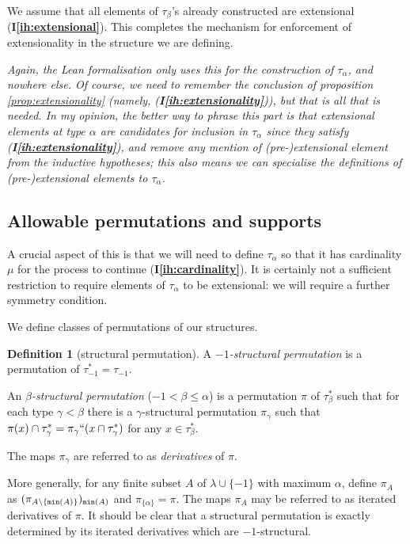 \documentclass[112pt]{article}
\theoremstyle{definition}
\newtheorem{definition}[theorem]{Definition}
\theoremstyle{remark}
\newcommand{\ihref}[1]{(\textbf{I\ref{#1}})}
\newcommand{\rk}[1]{{\color{blue}\sl #1}}
\newenvironment{annot}{\begin{center}\color{blue}\sl}{\end{center}}
\begin{document}
We assume that all elements of $\tau_\beta$'s already constructed are extensional \ihref{ih:extensional}.  This completes the mechanism for enforcement of extensionality in the structure we are defining.

\begin{annot}
  Again, the Lean formalisation only uses this for the construction of $\tau_\alpha$, and nowhere else.
  Of course, we need to remember the conclusion of proposition \ref{prop:extensionality} (namely, \ihref{ih:extensionality}), but that is all that is needed.
  In my opinion, the better way to phrase this part is that extensional elements at type $\alpha$ are candidates for inclusion in $\tau_\alpha$ since they satisfy \ihref{ih:extensionality}, and remove any mention of (pre-)extensional element from the inductive hypotheses; this also means we can specialise the definitions of (pre-)extensional elements to $\tau_\alpha$.
\end{annot}

\subsection{Allowable permutations and supports}

A crucial aspect of this is that we will need to define $\tau_\alpha$ so that it has cardinality $\mu$ for the process to continue {\ihref{ih:cardinality}}.  It is certainly not a sufficient restriction to require elements of $\tau_\alpha$ to be extensional:  we will require a further symmetry condition.

We define classes of permutations of our structures.
\begin{definition}[structural permutation]\label{def:structural_permutation}
A {\em $-1$-structural permutation\/} is a permutation of $\tau_{-1}^* = \tau_{-1}$.

An {\em $\beta$-structural permutation\/} ($-1 < \beta \leq \alpha$) is a permutation $\pi$ of $\tau_\beta^*$ such that for each type $\gamma<\beta$ there is a $\gamma$-structural permutation
$\pi_\gamma$ such that $\pi(x) \cap \tau^*_\gamma = \pi_\gamma``(x \cap \tau^*_\gamma)$ for any $x \in \tau^*_\beta$.

The maps $\pi_\gamma$ are referred to as {\em derivatives\/} of $\pi$.

More generally, for any finite subset $A$ of $\lambda \cup \{-1\}$ with maximum $\alpha$,
define $\pi_A$ as $(\pi_{A \setminus \{{\tt min}(A)\}})_{{\tt min}(A)}$ {and $\pi_{\{\alpha\}} = \pi$}.  The maps $\pi_A$ may be referred to as iterated derivatives of $\pi$.  It should be clear that a structural permutation is exactly determined by its iterated derivatives which are $-1$-structural.
\end{definition}
\end{document}
